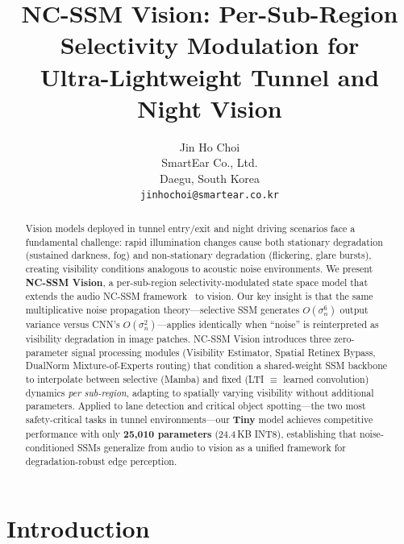 \documentclass[10pt,twocolumn,letterpaper]{article}
\begin{document}
\title{NC-SSM Vision: Per-Sub-Region Selectivity Modulation for\\
Ultra-Lightweight Tunnel and Night Vision}

\author{Jin Ho Choi\\
SmartEar Co., Ltd.\\
Daegu, South Korea\\
{\tt\small jinhochoi@smartear.co.kr}
}

\maketitle

\begin{abstract}
Vision models deployed in tunnel entry/exit and night driving scenarios face a fundamental challenge: rapid illumination changes cause both stationary degradation (sustained darkness, fog) and non-stationary degradation (flickering, glare bursts), creating visibility conditions analogous to acoustic noise environments.
We present \textbf{NC-SSM Vision}, a per-sub-region selectivity-modulated state space model that extends the audio NC-SSM framework~\cite{choi2026ncssm} to vision.
Our key insight is that the same multiplicative noise propagation theory---selective SSM generates $O(\sigma_n^6)$ output variance versus CNN's $O(\sigma_n^2)$---applies identically when ``noise'' is reinterpreted as visibility degradation in image patches.
NC-SSM Vision introduces three zero-parameter signal processing modules (Visibility Estimator, Spatial Retinex Bypass, DualNorm Mixture-of-Experts routing) that condition a shared-weight SSM backbone to interpolate between selective (Mamba) and fixed (LTI $\equiv$ learned convolution) dynamics \emph{per sub-region}, adapting to spatially varying visibility without additional parameters.
Applied to lane detection and critical object spotting---the two most safety-critical tasks in tunnel environments---our \textbf{Tiny} model achieves competitive performance with only \textbf{25,010 parameters} (24.4\,KB INT8), establishing that noise-conditioned SSMs generalize from audio to vision as a unified framework for degradation-robust edge perception.
\end{abstract}

\section{Introduction}
\label{sec:intro}
\end{document}
